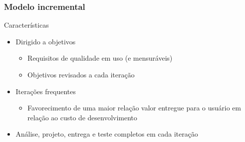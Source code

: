 \begin{frame}[hasnext=true, hasprev=true]
	\frametitle{Modelo incremental}

	\begin{block:fact}{Características}
		\begin{itemize}
			\item Dirigido a objetivos
			\begin{itemize}
				\item Requisitos de qualidade em uso (e mensuráveis)
				\item Objetivos revisados a cada iteração
			\end{itemize}
		
			\item Iterações frequentes
			\begin{itemize}
				\item Favorecimento de uma maior relação valor entregue para o usuário
				em relação ao custo de desenvolvimento
			\end{itemize}
			
			\item Análise, projeto, entrega e teste completos em cada iteração
		\end{itemize}
	\end{block:fact}
	
\end{frame}




